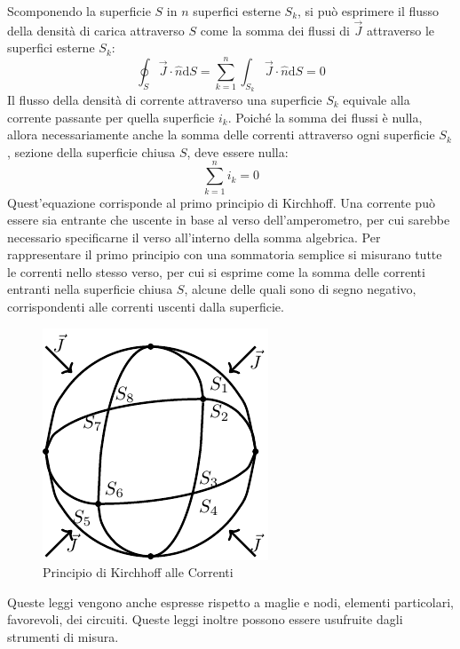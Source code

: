 \documentclass{article}
\newcommand{\df}{\mathrm{d}}
\numberwithin{equation}{subsection}
\begin{document}
Scomponendo la superficie $S$ in $n$ superfici esterne $S_k$, si può esprimere il flusso della densità di carica attraverso $S$ come la somma dei flussi di $\vec{J}$ attraverso 
le superfici esterne $S_k$:
\begin{equation*}
    \displaystyle\oint_{S}\vec{J}\cdot\hat{n}\df S=\sum_{k=1}^n\int_{S_k}\vec{J}\cdot\hat{n}\df S=0
\end{equation*}
Il flusso della densità di corrente attraverso una superficie $S_k$ equivale alla corrente passante per quella superficie $i_k$. Poiché la somma dei flussi è nulla, allora 
necessariamente anche la somma delle correnti attraverso ogni superficie $S_k$, sezione della superficie chiusa $S$, deve essere nulla:
\begin{equation}
    \displaystyle\sum_{k=1}^ni_k=0
\end{equation}
Quest'equazione corrisponde al primo principio di Kirchhoff. Una corrente può essere sia entrante che uscente in base al verso dell'amperometro, per cui sarebbe necessario 
specificarne il verso all'interno della somma algebrica. Per rappresentare il primo principio con una sommatoria semplice si misurano tutte le correnti nello stesso verso, 
per cui si esprime come la somma delle correnti entranti nella superficie chiusa $S$, alcune delle quali sono di segno negativo, corrispondenti alle correnti uscenti dalla 
superficie. 

\begin{figure}[H]%
    \centering
    \includegraphics{principio-kirchhoff-correnti.pdf}
    \caption{Principio di Kirchhoff alle Correnti}
    \label{fig:principio-kirchhoff-correnti}
\end{figure}

Queste leggi vengono anche espresse rispetto a maglie e nodi, elementi particolari, favorevoli, dei circuiti. Queste leggi inoltre possono essere usufruite dagli strumenti di 
misura. 
\end{document}

